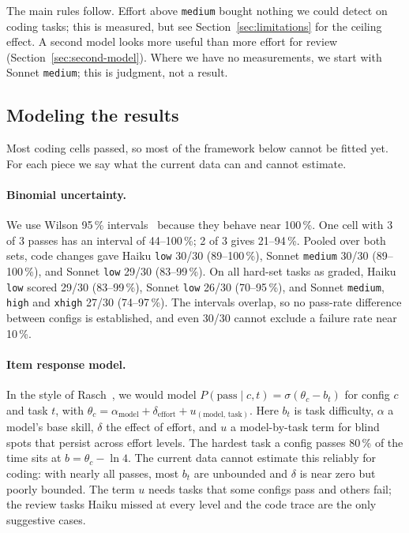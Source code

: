 The main rules follow. Effort above \texttt{medium} bought nothing we could detect on coding tasks; this is measured, but see Section~\ref{sec:limitations} for the ceiling effect. A second model looks more useful than more effort for review (Section~\ref{sec:second-model}). Where we have no measurements, we start with Sonnet \texttt{medium}; this is judgment, not a result.

\subsection{Modeling the results}\label{sec:modeling}

Most coding cells passed, so most of the framework below cannot be fitted yet. For each piece we say what the current data can and cannot estimate.

\paragraph{Binomial uncertainty.} We use Wilson 95\,\% intervals~\cite{wilson1927probable} because they behave near 100\,\%. One cell with 3 of 3 passes has an interval of 44--100\,\%; 2 of 3 gives 21--94\,\%. Pooled over both sets, code changes gave Haiku \texttt{low} 30/30 (89--100\,\%), Sonnet \texttt{medium} 30/30 (89--100\,\%), and Sonnet \texttt{low} 29/30 (83--99\,\%). On all hard-set tasks as graded, Haiku \texttt{low} scored 29/30 (83--99\,\%), Sonnet \texttt{low} 26/30 (70--95\,\%), and Sonnet \texttt{medium}, \texttt{high} and \texttt{xhigh} 27/30 (74--97\,\%). The intervals overlap, so no pass-rate difference between configs is established, and even 30/30 cannot exclude a failure rate near 10\,\%.

\paragraph{Item response model.} In the style of Rasch~\cite{rasch1960probabilistic}, we would model $P(\mathrm{pass} \mid c, t) = \sigma(\theta_c - b_t)$ for config $c$ and task $t$, with $\theta_c = \alpha_{\mathrm{model}} + \delta_{\mathrm{effort}} + u_{(\mathrm{model},\,\mathrm{task})}$. Here $b_t$ is task difficulty, $\alpha$ a model's base skill, $\delta$ the effect of effort, and $u$ a model-by-task term for blind spots that persist across effort levels. The hardest task a config passes 80\,\% of the time sits at $b = \theta_c - \ln 4$. The current data cannot estimate this reliably for coding: with nearly all passes, most $b_t$ are unbounded and $\delta$ is near zero but poorly bounded. The term $u$ needs tasks that some configs pass and others fail; the review tasks Haiku missed at every level and the code trace are the only suggestive cases.

